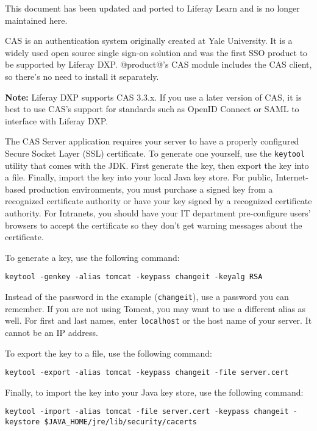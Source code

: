 {This document has been updated and ported to Liferay Learn and is no
longer maintained here.}

CAS is an authentication system originally created at Yale University.
It is a widely used open source single sign-on solution and was the
first SSO product to be supported by Liferay DXP. @product@'s CAS module
includes the CAS client, so there's no need to install it separately.

\noindent\hrulefill

\textbf{Note:} Liferay DXP supports CAS 3.3.x. If you use a later
version of CAS, it is best to use CAS's support for standards such as
OpenID Connect or SAML to interface with Liferay DXP.

\noindent\hrulefill

The CAS Server application requires your server to have a properly
configured Secure Socket Layer (SSL) certificate. To generate one
yourself, use the \texttt{keytool} utility that comes with the JDK.
First generate the key, then export the key into a file. Finally, import
the key into your local Java key store. For public, Internet-based
production environments, you must purchase a signed key from a
recognized certificate authority or have your key signed by a recognized
certificate authority. For Intranets, you should have your IT department
pre-configure users' browsers to accept the certificate so they don't
get warning messages about the certificate.

To generate a key, use the following command:

\begin{verbatim}
keytool -genkey -alias tomcat -keypass changeit -keyalg RSA
\end{verbatim}

Instead of the password in the example (\texttt{changeit}), use a
password you can remember. If you are not using Tomcat, you may want to
use a different alias as well. For first and last names, enter
\texttt{localhost} or the host name of your server. It cannot be an IP
address.

To export the key to a file, use the following command:

\begin{verbatim}
keytool -export -alias tomcat -keypass changeit -file server.cert
\end{verbatim}

Finally, to import the key into your Java key store, use the following
command:

\begin{verbatim}
keytool -import -alias tomcat -file server.cert -keypass changeit -keystore $JAVA_HOME/jre/lib/security/cacerts
\end{verbatim}

